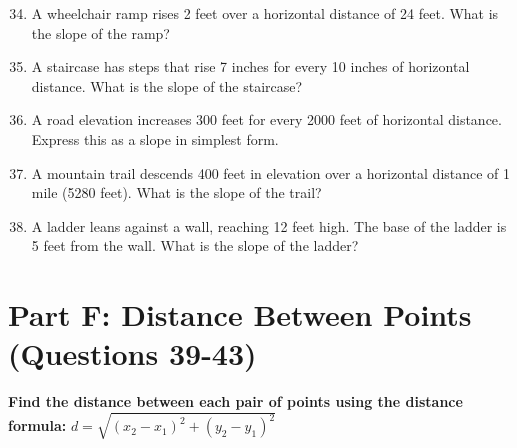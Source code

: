 \documentclass[12pt]{article}
\begin{document}
\begin{enumerate}
\setcounter{enumi}{33}

\item A wheelchair ramp rises 2 feet over a horizontal distance of 24 feet. What is the slope of the ramp?

\vspace{1.2cm}

\item A staircase has steps that rise 7 inches for every 10 inches of horizontal distance. What is the slope of the staircase?

\vspace{1.2cm}

\item A road elevation increases 300 feet for every 2000 feet of horizontal distance. Express this as a slope in simplest form.

\vspace{1.2cm}

\item A mountain trail descends 400 feet in elevation over a horizontal distance of 1 mile (5280 feet). What is the slope of the trail?

\vspace{1.2cm}

\item A ladder leans against a wall, reaching 12 feet high. The base of the ladder is 5 feet from the wall. What is the slope of the ladder?

\vspace{1.2cm}

\end{enumerate}

\section*{Part F: Distance Between Points (Questions 39-43)}

\noindent\textbf{Find the distance between each pair of points using the distance formula: } $d = \sqrt{(x_2 - x_1)^2 + (y_2 - y_1)^2}$
\end{document}
